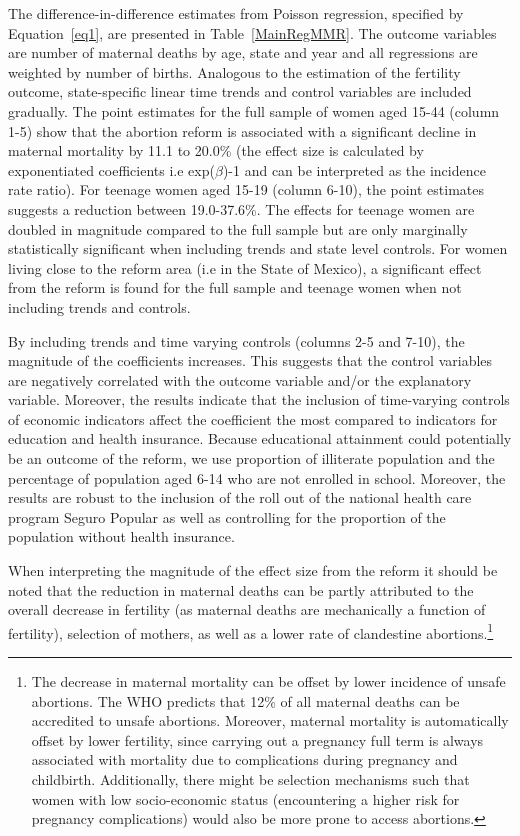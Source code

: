 \documentclass[a4paper, 11pt]{article}
\begin{document}
\begin{spacing}{2}
The difference-in-difference estimates from Poisson regression, specified by Equation~\eqref{eq1}, are presented in Table~\ref{MainRegMMR}. The outcome variables are number of maternal deaths by age, state and year and all regressions are weighted by number of births. Analogous to the estimation of the fertility outcome, state-specific linear time trends and control variables are included gradually. The point estimates for the full sample of women aged 15-44 (column 1-5) show that the abortion reform is associated with a significant decline in maternal mortality by 11.1 to 20.0\% (the effect size is calculated by exponentiated coefficients i.e exp($\beta$)-1 and can be interpreted as the incidence rate ratio). For teenage women aged 15-19 (column 6-10), the point estimates suggests a reduction between 19.0-37.6\%. The effects for teenage women are doubled in magnitude compared to the full sample but are only marginally statistically significant when including trends and state level controls. For women living close to the reform area (i.e in the State of Mexico), a significant effect from the reform is found for the full sample and teenage women when not including trends and controls.  

By including trends and time varying controls (columns 2-5 and 7-10), the magnitude of the coefficients increases. This suggests that the control variables are negatively correlated with the outcome variable and/or the explanatory variable. Moreover, the results indicate that the inclusion of time-varying controls of economic indicators affect the coefficient the most compared to indicators for education and health insurance. Because educational attainment could potentially be an outcome of the reform, we use proportion of illiterate population and the percentage of population aged 6-14 who are not enrolled in school. Moreover, the results are robust to the inclusion of the roll out of the national health care program Seguro Popular as well as controlling for the proportion of the population without health insurance. 

When interpreting the magnitude of the effect size from the reform it should be noted that the reduction in maternal deaths can be partly attributed to the overall decrease in fertility (as maternal deaths are mechanically a function of fertility), selection of mothers, as well as a lower rate of clandestine abortions.\footnote{The decrease in maternal mortality can be offset by lower incidence of unsafe abortions. The WHO predicts that 12\% of all maternal deaths can be accredited to unsafe abortions. Moreover, maternal mortality is automatically offset by lower fertility, since carrying out a pregnancy full term is always associated with mortality due to complications during pregnancy and childbirth. Additionally, there might be selection mechanisms such that women with low socio-economic status (encountering a higher risk for pregnancy complications) would also be more prone to access abortions.} 
 

\end{spacing}
\end{document}
